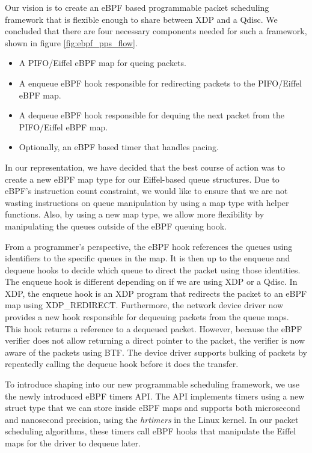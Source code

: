 \documentclass[sigconf, nonacm]{acmart}
\begin{document}
Our vision is to create an eBPF based programmable packet scheduling framework
that is flexible enough to share between XDP and a Qdisc. We concluded that
there are four necessary components needed for such a framework, shown in figure
\ref{fig:ebpf_pps_flow}.

\begin{itemize}
        \item A PIFO/Eiffel eBPF map for queing packets.
        \item A enqueue eBPF hook responsible for redirecting packets to the PIFO/Eiffel eBPF map.
        \item A dequeue eBPF hook responsible for dequing the next packet from the PIFO/Eiffel eBPF map.
        \item Optionally, an eBPF based timer that handles pacing.
\end{itemize}

In our representation, we have decided that the best course of action was to
create a new eBPF map type for our Eiffel-based queue structures. Due to eBPF's
instruction count constraint, we would like to ensure that we are not wasting
instructions on queue manipulation by using a map type with helper functions.
Also, by using a new map type, we allow more flexibility by manipulating the
queues outside of the eBPF queuing hook.

From a programmer's perspective, the eBPF hook references the queues using
identifiers to the specific queues in the map. It is then up to the enqueue and
dequeue hooks to decide which queue to direct the packet using those identities.
The enqueue hook is different depending on if we are using XDP or a Qdisc. In
XDP, the enqueue hook is an XDP program that redirects the packet to an eBPF map
using XDP\_REDIRECT. Furthermore, the network device driver now provides a new
hook responsible for dequeuing packets from the queue maps. This hook returns a
reference to a dequeued packet. However, because the eBPF verifier does not
allow returning a direct pointer to the packet, the verifier is now aware of the
packets using BTF. The device driver supports bulking of packets by repeatedly
calling the dequeue hook before it does the transfer.

To introduce shaping into our new programmable scheduling framework, we use the
newly introduced eBPF timers API. The API implements timers using a new struct
type that we can store inside eBPF maps and supports both microsecond and
nanosecond precision, using the \textit{hrtimers} in the Linux kernel. In our
packet scheduling algorithms, these timers call eBPF hooks that manipulate the
Eiffel maps for the driver to dequeue later.
\end{document}
